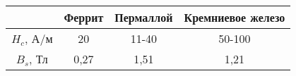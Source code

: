 \begin{tabular}{cccc}
\toprule
& Феррит & Пермаллой & Кремниевое железо \\
\midrule
$H_c$, А/м  & 20    & 11-40 & 50-100    \\
$B_s$, Тл   & 0,27  & 1,51  & 1,21      \\
\bottomrule
\end{tabular}
